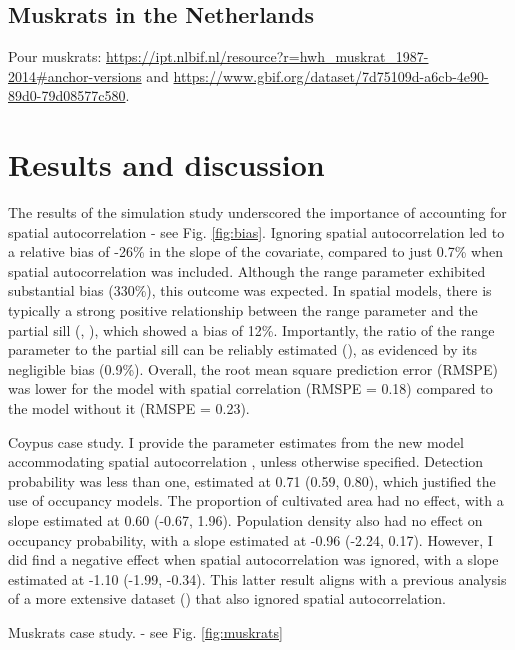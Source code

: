 \documentclass[
  11pt,
  a4paper,
]{article}
\begin{document}
\subsection{Muskrats in the Netherlands}\label{muskrats-in-the-netherlands}

Pour muskrats: \url{https://ipt.nlbif.nl/resource?r=hwh_muskrat_1987-2014\#anchor-versions} and \url{https://www.gbif.org/dataset/7d75109d-a6cb-4e90-89d0-79d08577c580}.

\section{Results and discussion}\label{results-and-discussion}

The results of the simulation study underscored the importance of accounting for spatial autocorrelation - see Fig. \ref{fig:bias}. Ignoring spatial autocorrelation led to a relative bias of -26\% in the slope of the covariate, compared to just 0.7\% when spatial autocorrelation was included. Although the range parameter exhibited substantial bias (330\%), this outcome was expected. In spatial models, there is typically a strong positive relationship between the range parameter and the partial sill (, ), which showed a bias of 12\%. Importantly, the ratio of the range parameter to the partial sill can be reliably estimated (), as evidenced by its negligible bias (0.9\%). Overall, the root mean square prediction error (RMSPE) was lower for the model with spatial correlation (RMSPE = 0.18) compared to the model without it (RMSPE = 0.23).

Coypus case study. I provide the parameter estimates from the new model accommodating spatial autocorrelation , unless otherwise specified. Detection probability was less than one, estimated at 0.71 (0.59, 0.80), which justified the use of occupancy models. The proportion of cultivated area had no effect, with a slope estimated at 0.60 (-0.67, 1.96). Population density also had no effect on occupancy probability, with a slope estimated at -0.96 (-2.24, 0.17). However, I did find a negative effect when spatial autocorrelation was ignored, with a slope estimated at -1.10 (-1.99, -0.34). This latter result aligns with a previous analysis of a more extensive dataset () that also ignored spatial autocorrelation.

Muskrats case study. - see Fig. \ref{fig:muskrats}
\end{document}
